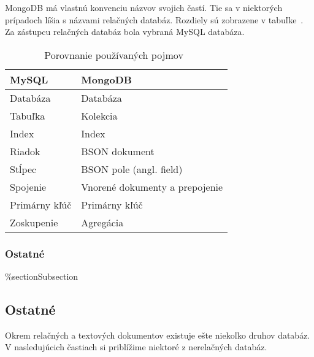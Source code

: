 MongoDB má vlastnú konvenciu názvov svojich častí. Tie sa v niektorých prípadoch líšia s názvami relačných databáz. Rozdiely sú zobrazene v tabuľke~. Za zástupcu relačných databáz bola vybraná MySQL databáza. 

\begin{table}[H]
	\centering
	\caption{Porovnanie používaných pojmov~\cite{MongoDBvsMySQL2015}}
	\label{table:names_of_mongodb}
	\begin{tabular}{|l|l|}
		\hline
		\textbf{MySQL} & \textbf{MongoDB} \\ \hline
		Databáza & Databáza \\ \hline
		Tabuľka & Kolekcia \\ \hline
		Index & Index \\ \hline
		Riadok & BSON dokument \\ \hline
		Stĺpec & BSON pole (angl. field) \\ \hline
		Spojenie & Vnorené dokumenty a prepojenie \\ \hline
		Primárny kľúč & Primárny kľúč \\ \hline
		Zoskupenie & Agregácia \\ \hline
	\end{tabular}
\end{table}

%
%
{
	\subsubsection{Ostatné}
}
{
	\%section{Subsection}
	\subsection{Ostatné}
}
\label{subsection:types_of_norelation_dbs}
Okrem relačných a textových dokumentov existuje ešte niekoľko druhov databáz. V nasledujúcich častiach si priblížime niektoré z nerelačných databáz.

